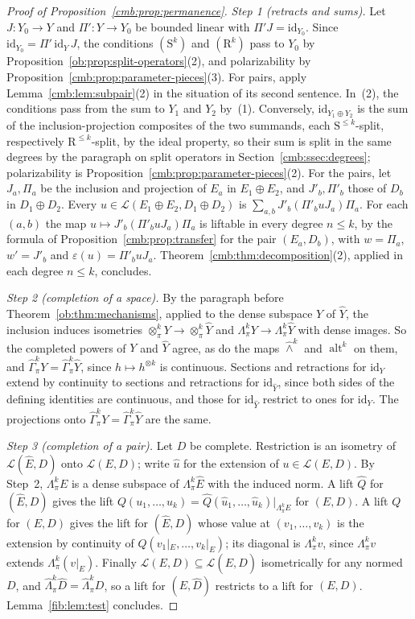 \documentclass[11pt]{amsart}
\theoremstyle{definition}
\theoremstyle{remark}
\numberwithin{equation}{section}
\newcommand{\cL}{\mathcal L}
\newcommand{\id}{\mathrm{id}}
\theoremstyle{plain}
\theoremstyle{definition}
\theoremstyle{plain}
\newcommand{\alt}{\operatorname{alt}}
\newcommand{\hGamma}{\widehat\Gamma}
\begin{document}
\begin{proof}[Proof of Proposition~\ref{cmb:prop:permanence}]
\emph{Step 1 (retracts and sums).} Let $J\colon Y_0\to Y$ and $\Pi'\colon Y\to Y_0$ be bounded linear with
$\Pi'J=\id_{Y_0}$. Since $\id_{Y_0}=\Pi'\,\id_Y\,J$, the conditions $(\mathrm S^k)$ and $(\mathrm R^k)$ pass to $Y_0$ by
Proposition~\ref{ob:prop:split-operators}(2), and polarizability by Proposition~\ref{cmb:prop:parameter-pieces}(3). For
pairs, apply Lemma~\ref{cmb:lem:subpair}(2) in the situation of its second sentence. In~(2), the conditions pass from the
sum to $Y_1$ and $Y_2$ by~(1). Conversely, $\id_{Y_1\oplus Y_2}$ is the sum of the inclusion-projection composites of the
two summands, each $\mathrm S^{\le k}$-split, respectively $\mathrm R^{\le k}$-split, by the ideal property, so their sum
is split in the same degrees by the paragraph on split operators in Section~\ref{cmb:ssec:degrees}; polarizability is
Proposition~\ref{cmb:prop:parameter-pieces}(2). For the pairs, let $J_a,\Pi_a$ be the inclusion and projection of $E_a$
in $E_1\oplus E_2$, and $J'_b,\Pi'_b$ those of $D_b$ in $D_1\oplus D_2$. Every $u\in\cL(E_1\oplus E_2,D_1\oplus D_2)$ is
$\sum_{a,b}J'_b(\Pi'_buJ_a)\Pi_a$. For each $(a,b)$ the map $u\mapsto J'_b(\Pi'_buJ_a)\Pi_a$ is liftable in every degree
$n\le k$, by the formula of Proposition~\ref{cmb:prop:transfer} for the pair $(E_a,D_b)$, with $w=\Pi_a$, $w'=J'_b$ and
$\varepsilon(u)=\Pi'_buJ_a$. Theorem~\ref{cmb:thm:decomposition}(2), applied in each degree $n\le k$, concludes.

\emph{Step 2 (completion of a space).} By the paragraph before Theorem~\ref{ob:thm:mechanisms}, applied to the dense
subspace $Y$ of $\widehat Y$, the inclusion induces isometries $\otimes^k_\pi Y\to\otimes^k_\pi\widehat Y$ and
$\Lambda^k_\pi Y\to\Lambda^k_\pi\widehat Y$ with dense images. So the completed powers of $Y$ and $\widehat Y$ agree, as do
the maps $\widehat\wedge^k$ and $\alt^k$ on them, and $\hGamma^k_\pi Y=\hGamma^k_\pi\widehat Y$, since
$h\mapsto h^{\otimes k}$ is continuous. Sections and retractions for $\id_Y$ extend by continuity to sections and
retractions for $\id_{\widehat Y}$, since both sides of the defining identities are continuous, and those for
$\id_{\widehat Y}$ restrict to ones for $\id_Y$. The projections onto $\hGamma^k_\pi Y=\hGamma^k_\pi\widehat Y$ are the
same.

\emph{Step 3 (completion of a pair).} Let $D$ be complete. Restriction is an isometry of $\cL(\widehat E,D)$ onto
$\cL(E,D)$; write $\widehat u$ for the extension of $u\in\cL(E,D)$. By Step~2, $\Lambda^k_\pi E$ is a dense subspace of
$\Lambda^k_\pi\widehat E$ with the induced norm. A lift $\widehat Q$ for $(\widehat E,D)$ gives the lift
$Q(u_1,\dots,u_k)=\widehat Q(\widehat u_1,\dots,\widehat u_k)|_{\Lambda^k_\pi E}$ for $(E,D)$. A lift $Q$ for $(E,D)$ gives the lift for $(\widehat E,D)$ whose value at $(v_1,\dots,v_k)$ is the extension
by continuity of $Q(v_1|_E,\dots,v_k|_E)$; its diagonal is $\Lambda^k_\pi v$, since $\Lambda^k_\pi v$ extends
$\Lambda^k_\pi(v|_E)$. Finally $\cL(E,D)\subseteq\cL(E,\widehat D)$ isometrically for any normed $D$, and
$\widehat\Lambda^k_\pi\widehat D=\widehat\Lambda^k_\pi D$, so a lift for $(E,\widehat D)$ restricts to a lift for
$(E,D)$. Lemma~\ref{fib:lem:test} concludes.
\end{proof}
\end{document}
